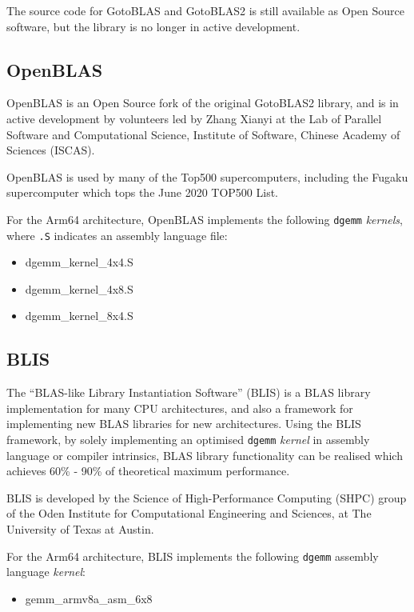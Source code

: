\documentclass{report}
\begin{document}
The source code for GotoBLAS and GotoBLAS2 is still available as Open Source software, but the library is no longer in active development.


%
%
\subsection{OpenBLAS}

OpenBLAS is an Open Source fork of the original GotoBLAS2 library, and is in active development by volunteers led by Zhang Xianyi at the Lab of Parallel Software and Computational Science, Institute of Software, Chinese Academy of Sciences (ISCAS).

OpenBLAS is used by many of the Top500 supercomputers, including the Fugaku supercomputer which tops the June 2020 TOP500 List.

For the Arm64 architecture, OpenBLAS implements the following \verb|dgemm| \emph{kernels}, where \verb|.S| indicates an assembly language file:

\begin{itemize}
  \item dgemm\_kernel\_4x4.S
  \item dgemm\_kernel\_4x8.S
  \item dgemm\_kernel\_8x4.S 
\end{itemize}


%
%
\subsection{BLIS}

The ``BLAS-like Library Instantiation Software'' (BLIS) is a BLAS library implementation for many CPU architectures, and also a framework for implementing new BLAS libraries for new architectures. Using the BLIS framework, by solely implementing an optimised \verb|dgemm| \emph{kernel} in assembly language or compiler intrinsics, BLAS library functionality can be realised which achieves 60\% - 90\% of theoretical maximum performance.

BLIS is developed by the Science of High-Performance Computing (SHPC) group of the Oden Institute for Computational Engineering and Sciences, at The University of Texas at Austin.

For the Arm64 architecture, BLIS implements the following \verb|dgemm| assembly language \emph{kernel}:

\begin{itemize}
  \item gemm\_armv8a\_asm\_6x8
\end{itemize}
\end{document}
